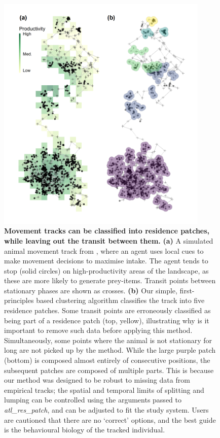 \begin{figure}[ht!]
    \centering
    \includegraphics[width=0.9\textwidth]{figures/preprocessing/fig_06.png}
    \caption{
        \textbf{Movement tracks can be classified into residence patches, while leaving out the transit between them.}
        \textbf{(a)} A simulated animal movement track from \citealt{gupte2021a}, where an agent uses local cues to make movement decisions to maximise intake.
        The agent tends to stop (solid circles) on high-productivity areas of the landscape, as these are more likely to generate prey-items.
        Transit points between stationary phases are shown as crosses.
        \textbf{(b)} Our simple, first-principles based clustering algorithm classifies the track into five residence patches. 
        Some transit points are erroneously classified as being part of a residence patch (top, yellow), illustrating why is it important to remove such data before applying this method.
        Simultaneously, some points where the animal is not stationary for long are not picked up by the method.
        While the large purple patch (bottom) is composed almost entirely of consecutive positions, the subsequent patches are composed of multiple parts.
        This is because our method was designed to be robust to missing data from empirical tracks; the spatial and temporal limits of splitting and lumping can be controlled using the arguments passed to \textit{atl\_res\_patch}, and can be adjusted to fit the study system.
        Users are cautioned that there are no `correct' options, and the best guide is the behavioural biology of the tracked individual.
    }
    \label{preproc_fig_06}
\end{figure}

